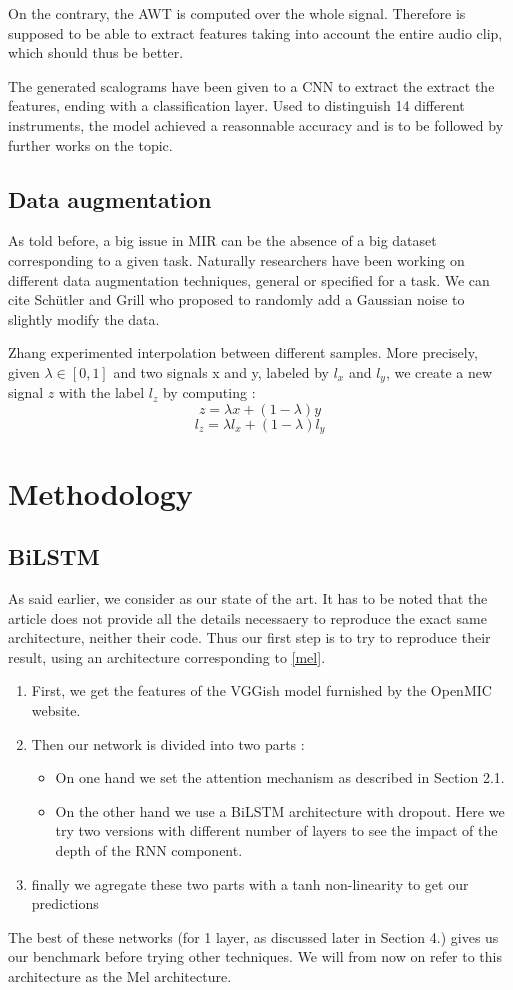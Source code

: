 \documentclass[final]{cvpr}
\begin{document}
On the contrary, the AWT is computed over the whole signal. Therefore is supposed to be able to extract features taking into account the entire audio clip, which should thus be better.

The generated scalograms have been given to a CNN to extract the extract the features, ending with a classification layer. Used to distinguish 14 different instruments, the model achieved a reasonnable accuracy and is to be followed by further works on the topic.
\subsection{Data augmentation}
As told before, a big issue in MIR can be the absence of a big dataset corresponding to a given task. Naturally researchers have been working on different data augmentation techniques, general or specified for a task. We can cite Schütler and Grill \cite{data_aug} who proposed to randomly add a Gaussian noise to slightly modify the data. 

Zhang \etal \cite{interpol} experimented interpolation between different samples. More precisely, given $\lambda\in[0,1]$ and two signals x and y, labeled by $l_x$ and $l_y$, we create a new signal $z$ with the label $l_z$ by computing :
\[z = \lambda x+(1-\lambda)y\]
\[l_z = \lambda l_x+(1-\lambda)l_y\]
\section{Methodology}
\subsection{BiLSTM}
As said earlier, we consider \cite{squelette_progr} as our state of the art. It has to be noted that the article does not provide all the details necessaery to reproduce the exact same architecture, neither their code. Thus our first step is to try to reproduce their result, using an architecture corresponding to \ref{mel}.
\begin{enumerate}
	\item First, we get the features of the VGGish model furnished by the OpenMIC website.
	\item Then our network is divided into two parts :
	\begin{itemize}
		\item On one hand we set the attention mechanism as described in Section 2.1.
		\item On the other hand we use a BiLSTM architecture with dropout. Here we try two versions with different number of layers to see the impact of the depth of the RNN component.
	\end{itemize}
	\item finally we agregate these two parts with a tanh non-linearity to get our predictions
\end{enumerate}
The best of these networks (for 1 layer, as discussed later in Section 4.) gives us our benchmark before trying other techniques. We will from now on refer to this architecture as the Mel architecture.
\end{document}
